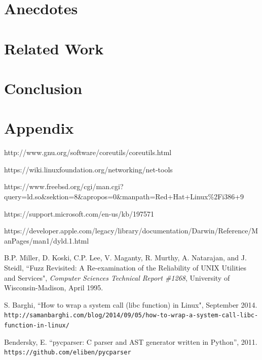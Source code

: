 \documentclass[10pt]{article}
\begin{document}
\section{Anecdotes}

\section{Related Work}

\section{Conclusion}

\section*{Appendix}

\begin{thebibliography}{9}
	http://www.gnu.org/software/coreutils/coreutils.html
	
	https://wiki.linuxfoundation.org/networking/net-tools
	
	https://www.freebsd.org/cgi/man.cgi?query=ld.so\&sektion=8\&apropos=0\&manpath=Red+Hat+Linux\%2Fi386+9
	
	https://support.microsoft.com/en-us/kb/197571
	
	https://developer.apple.com/legacy/library/documentation/Darwin/Reference/ManPages/man1/dyld.1.html
	
	B.P. Miller, D. Koski, C.P. Lee, V. Maganty, R. Murthy, A. Natarajan, and J. Steidl, ``Fuzz Revisited: A Re-examination of the Reliability of UNIX Utilities and Services", \textit{Computer Sciences Technical Report \#1268}, University of Wisconsin-Madison, April 1995.
	
	S. Barghi, ``How to wrap a system call (libc function) in Linux", September 2014.\\
	\texttt{http://samanbarghi.com/blog/2014/09/05/how-to-wrap-a-system-call-libc-function-in-linux/}
	
	Bendersky, E. ``pycparser: C parser and AST generator written in Python'', 2011.\\
	\texttt{https://github.com/eliben/pycparser}
\end{thebibliography}
\end{document}

